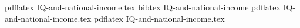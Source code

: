pdflatex IQ-and-national-income.tex
bibtex IQ-and-national-income
pdflatex IQ-and-national-income.tex
pdflatex IQ-and-national-income.tex
